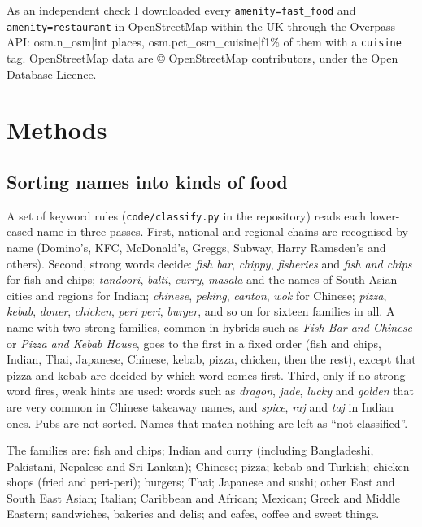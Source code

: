 \documentclass[11pt,a4paper]{article}
\begin{document}
As an independent check I downloaded every \texttt{amenity=fast\_food} and \texttt{amenity=restaurant} in OpenStreetMap within the UK through the Overpass API: {{osm.n_osm|int}} places, {{osm.pct_osm_cuisine|f1}}\% of them with a \texttt{cuisine} tag. OpenStreetMap data are \copyright{} OpenStreetMap contributors, under the Open Database Licence.

\section{Methods}

\subsection{Sorting names into kinds of food}

A set of keyword rules (\texttt{code/classify.py} in the repository) reads each lower-cased name in three passes. First, national and regional chains are recognised by name (Domino's, KFC, McDonald's, Greggs, Subway, Harry Ramsden's and others). Second, strong words decide: \textit{fish bar}, \textit{chippy}, \textit{fisheries} and \textit{fish and chips} for fish and chips; \textit{tandoori}, \textit{balti}, \textit{curry}, \textit{masala} and the names of South Asian cities and regions for Indian; \textit{chinese}, \textit{peking}, \textit{canton}, \textit{wok} for Chinese; \textit{pizza}, \textit{kebab}, \textit{doner}, \textit{chicken}, \textit{peri peri}, \textit{burger}, and so on for sixteen families in all. A name with two strong families, common in hybrids such as \textit{Fish Bar and Chinese} or \textit{Pizza and Kebab House}, goes to the first in a fixed order (fish and chips, Indian, Thai, Japanese, Chinese, kebab, pizza, chicken, then the rest), except that pizza and kebab are decided by which word comes first. Third, only if no strong word fires, weak hints are used: words such as \textit{dragon}, \textit{jade}, \textit{lucky} and \textit{golden} that are very common in Chinese takeaway names, and \textit{spice}, \textit{raj} and \textit{taj} in Indian ones. Pubs are not sorted. Names that match nothing are left as ``not classified''.

The families are: fish and chips; Indian and curry (including Bangladeshi, Pakistani, Nepalese and Sri Lankan); Chinese; pizza; kebab and Turkish; chicken shops (fried and peri-peri); burgers; Thai; Japanese and sushi; other East and South East Asian; Italian; Caribbean and African; Mexican; Greek and Middle Eastern; sandwiches, bakeries and delis; and cafes, coffee and sweet things.
\end{document}
